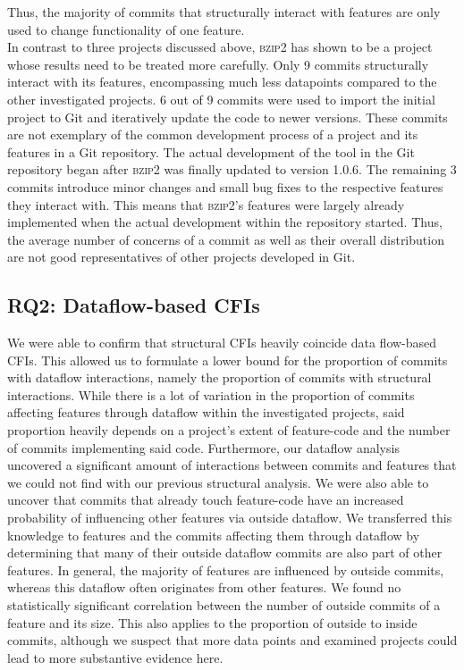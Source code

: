 Thus, the majority of commits that structurally interact with features are only used to change functionality of one feature. \\
In contrast to three projects discussed above, \textsc{bzip2} has shown to be a project whose results need to be treated more carefully.
Only 9 commits structurally interact with its features, encompassing much less datapoints compared to the other investigated projects.
6 out of 9 commits were used to import the initial project to Git and iteratively update the code to newer versions.
These commits are not exemplary of the common development process of a project and its features in a Git repository.
The actual development of the tool in the Git repository began after \textsc{bzip2} was finally updated to version 1.0.6.
The remaining 3 commits introduce minor changes and small bug fixes to the respective features they interact with.
This means that \textsc{bzip2}'s features were largely already implemented when the actual development within the repository started.
Thus, the average number of concerns of a commit as well as their overall distribution are not good representatives of other projects developed in Git. 

\subsection*{\textbf{RQ2: Dataflow-based CFIs}}\label{sec:disc_df_cfis}

We were able to confirm that structural CFIs heavily coincide data flow-based CFIs.
This allowed us to formulate a lower bound for the proportion of commits with dataflow interactions, namely the proportion of commits with structural interactions.
While there is a lot of variation in the proportion of commits affecting features through dataflow within the investigated projects, said proportion heavily depends on a project's extent of feature-code and the number of commits implementing said code.
Furthermore, our dataflow analysis uncovered a significant amount of interactions between commits and features that we could not find with our previous structural analysis.
We were also able to uncover that commits that already touch feature-code have an increased probability of influencing other features via outside dataflow.
We transferred this knowledge to features and the commits affecting them through dataflow by determining that many of their outside dataflow commits are also part of other features.
In general, the majority of features are influenced by outside commits, whereas this dataflow often originates from other features.
We found no statistically significant correlation between the number of outside commits of a feature and its size.
This also applies to the proportion of outside to inside commits, although we suspect that more data points and examined projects could lead to more substantive evidence here.

